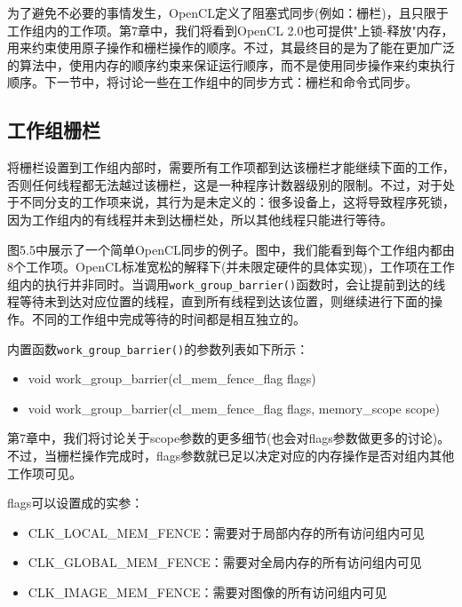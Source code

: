 为了避免不必要的事情发生，OpenCL定义了阻塞式同步(例如：栅栏)，且只限于工作组内的工作项。第7章中，我们将看到OpenCL 2.0也可提供"上锁-释放"内存，用来约束使用原子操作和栅栏操作的顺序。不过，其最终目的是为了能在更加广泛的算法中，使用内存的顺序约束来保证运行顺序，而不是使用同步操作来约束执行顺序。下一节中，将讨论一些在工作组中的同步方式：栅栏和命令式同步。

\subsection{工作组栅栏}

将栅栏设置到工作组内部时，需要所有工作项都到达该栅栏才能继续下面的工作，否则任何线程都无法越过该栅栏，这是一种程序计数器级别的限制。不过，对于处于不同分支的工作项来说，其行为是未定义的：很多设备上，这将导致程序死锁，因为工作组内的有线程并未到达栅栏处，所以其他线程只能进行等待。

图5.5中展示了一个简单OpenCL同步的例子。图中，我们能看到每个工作组内都由8个工作项。OpenCL标准宽松的解释下(并未限定硬件的具体实现)，工作项在工作组内的执行并非同时。当调用\texttt{work\_group\_barrier()}函数时，会让提前到达的线程等待未到达对应位置的线程，直到所有线程到达该位置，则继续进行下面的操作。不同的工作组中完成等待的时间都是相互独立的。

内置函数\texttt{work\_group\_barrier()}的参数列表如下所示：

\begin{itemize}
\item void work\_\allowbreak{}group\_\allowbreak{}barrier(cl\_\allowbreak{}mem\_\allowbreak{}fence\_\allowbreak{}flag flags)
\item void work\_\allowbreak{}group\_\allowbreak{}barrier(cl\_\allowbreak{}mem\_\allowbreak{}fence\_\allowbreak{}flag flags, memory\_\allowbreak{}scope scope)
\end{itemize}


第7章中，我们将讨论关于scope参数的更多细节(也会对flags参数做更多的讨论)。不过，当栅栏操作完成时，flags参数就已足以决定对应的内存操作是否对组内其他工作项可见。

flags可以设置成的实参：

\begin{itemize}
\item CLK\_\allowbreak{}LOCAL\_\allowbreak{}MEM\_\allowbreak{}FENCE：需要对于局部内存的所有访问组内可见
\item CLK\_\allowbreak{}GLOBAL\_\allowbreak{}MEM\_\allowbreak{}FENCE：需要对全局内存的所有访问组内可见
\item CLK\_\allowbreak{}IMAGE\_\allowbreak{}MEM\_\allowbreak{}FENCE：需要对图像的所有访问组内可见
\end{itemize}

